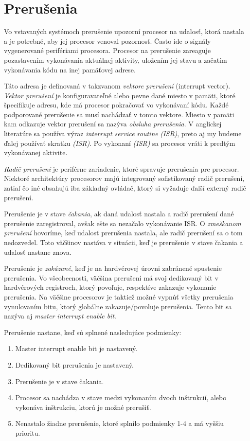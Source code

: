 \section{Prerušenia}
\noindent Vo vstavaných systémoch prerušenie upozorní procesor na udalosť, ktorá nastala a je potrebné, aby jej procesor venoval pozornosť. Často ide o signály vygenerované perifériami procesora. Procesor na prerušenie zareaguje pozastavením vykonávania aktuálnej aktivity, uložením jej stavu a začatím vykonávania kódu na inej pamäťovej adrese. \par 
Táto adresa je definovaná v takzvanom \textit{vektore prerušení} (interrupt vector). \textit{Vektor prerušení} je konfiguravateľné alebo pevne dané miesto v pamäti, ktoré špecifikuje adresu, kde má procesor pokračovať vo vykonávaní kódu. Každé podporované prerušenie sa musí nachádzať v tomto vektore. Miesto v pamäti kam odkazuje vektor prerušení sa nazýva \textit{obsluha prerušenia}. V anglickej literatúre sa používa výraz \textit{interrupt service routine} \textit{(ISR)}, preto aj my budeme ďalej používať skratku  \textit{(ISR)}. Po vykonaní  \textit{(ISR)} sa procesor vráti k predtým vykonávanej aktivite. \par
\textit{Radič prerušení} je periférne zariadenie, ktoré spravuje prerušenia pre procesor. Niektoré architektúry procesorov majú integrovaný sofistikovaný radič prerušení, zatiaľ čo iné obsahujú iba základný ovládač, ktorý si vyžaduje ďalší externý radič prerušení. \par
Prerušenie je v stave \textit{čakania}, ak daná udalosť nastala a radič prerušení dané prerušenie zaregistroval, avšak ešte sa nezačalo vykonávanie ISR.  O \textit{zmeškanom prerušení} hovoríme, keď udalosť prerušenia nastala, ale radič prerušení sa o tom nedozvedel. Toto väčšinov nastáva v situácii, keď je prerušenie v stave čakania a udalosť nastane znova. \par
Prerušenie je \textit{zakázané}, keď je na hardvérovej úrovni zabránené spustenie prerušenia. Vo všeobecnosti, väčšina prerušení má svoj dedikovaný bit v hardvérových registroch, ktorý povoľuje, respektíve zakazuje vykonanie prerušenia. Na väčšine procesorov je taktiež možné vypnúť všetky prerušenia vynulovaním bitu, ktorý globálne zakazuje/povoluje prerušenia. Tento bit sa nazýva aj \textit{master interrupt enable bit}.\par 
Prerušenie nastane, keď sú splnené nasledujúce podmienky:
\begin{enumerate}
    \item Master interrupt enable bit je nastavený.
    \item Dedikovaný bit prerušenia je nastavený.
    \item Prerušenie je v stave čakania.
    \item Procesor sa nachádza v stave medzi vykonaním dvoch inštrukcií, alebo vykonáva inštrukciu, ktorú je možné prerušiť.
    \item Nenastalo žiadne prerušenie, ktoré splnilo podmienky 1-4 a má vyššiu prioritu.
  \end{enumerate} 
